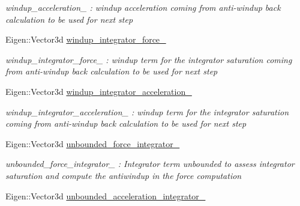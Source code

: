 \begin{DoxyCompactItemize}
\begin{DoxyCompactList}\small\item\em windup\-\_\-acceleration\-\_\- \-: windup acceleration coming from anti-\/windup back calculation to be used for next step \end{DoxyCompactList}\item 
\hypertarget{class_skye_geometric_controller_a304061e1dc23671e4ec776d474ad48ae}{Eigen\-::\-Vector3d \hyperlink{class_skye_geometric_controller_a304061e1dc23671e4ec776d474ad48ae}{windup\-\_\-integrator\-\_\-force\-\_\-}}\label{class_skye_geometric_controller_a304061e1dc23671e4ec776d474ad48ae}

\begin{DoxyCompactList}\small\item\em windup\-\_\-integrator\-\_\-force\-\_\- \-: windup term for the integrator saturation coming from anti-\/windup back calculation to be used for next step \end{DoxyCompactList}\item 
\hypertarget{class_skye_geometric_controller_a87b90c49410f43b9e41a9bd86f8a1e0d}{Eigen\-::\-Vector3d \hyperlink{class_skye_geometric_controller_a87b90c49410f43b9e41a9bd86f8a1e0d}{windup\-\_\-integrator\-\_\-acceleration\-\_\-}}\label{class_skye_geometric_controller_a87b90c49410f43b9e41a9bd86f8a1e0d}

\begin{DoxyCompactList}\small\item\em windup\-\_\-integrator\-\_\-acceleration\-\_\- \-: windup term for the integrator saturation coming from anti-\/windup back calculation to be used for next step \end{DoxyCompactList}\item 
\hypertarget{class_skye_geometric_controller_a1d3108b39222097a8d85119bf1f386d0}{Eigen\-::\-Vector3d \hyperlink{class_skye_geometric_controller_a1d3108b39222097a8d85119bf1f386d0}{unbounded\-\_\-force\-\_\-integrator\-\_\-}}\label{class_skye_geometric_controller_a1d3108b39222097a8d85119bf1f386d0}

\begin{DoxyCompactList}\small\item\em unbounded\-\_\-force\-\_\-integrator\-\_\- \-: Integrator term unbounded to assess integrator saturation and compute the antiwindup in the force computation \end{DoxyCompactList}\item 
\hypertarget{class_skye_geometric_controller_a09845bc6ef60b035c2009b552fc86b72}{Eigen\-::\-Vector3d \hyperlink{class_skye_geometric_controller_a09845bc6ef60b035c2009b552fc86b72}{unbounded\-\_\-acceleration\-\_\-integrator\-\_\-}}\label{class_skye_geometric_controller_a09845bc6ef60b035c2009b552fc86b72}


\end{DoxyCompactItemize}
